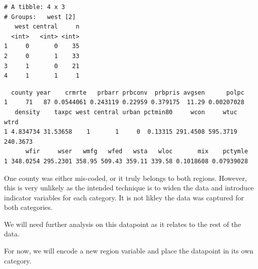 \documentclass[]{article}
\newenvironment{Shaded}{}{}
\newcommand{\DecValTok}[1]{#1}
\newcommand{\KeywordTok}[1]{\textcolor[rgb]{0.00,0.00,1.00}{#1}}
\newcommand{\NormalTok}[1]{#1}
\newcommand{\OperatorTok}[1]{#1}
\newcommand{\StringTok}[1]{\textcolor[rgb]{0.00,0.50,0.50}{#1}}
\begin{document}
\begin{verbatim}
# A tibble: 4 x 3
# Groups:   west [2]
   west central     n
  <int>   <int> <int>
1     0       0    35
2     0       1    33
3     1       0    21
4     1       1     1
\end{verbatim}

\begin{Shaded}
\end{Shaded}

\begin{verbatim}
  county year    crmrte   prbarr prbconv  prbpris avgsen      polpc
1     71   87 0.0544061 0.243119 0.22959 0.379175  11.29 0.00207028
   density    taxpc west central urban pctmin80     wcon     wtuc     wtrd
1 4.834734 31.53658    1       1     0  0.13315 291.4508 595.3719 240.3673
      wfir     wser   wmfg   wfed   wsta   wloc       mix    pctymle
1 348.0254 295.2301 358.95 509.43 359.11 339.58 0.1018608 0.07939028
\end{verbatim}

One county was either mis-coded, or it truly belongs to both regions.
However, this is very unlikely as the intended technique is to widen the
data and introduce indicator variables for each category. It is not
likley the data was captured for both categories.

We will need further analysis on this datapoint as it relates to the
rest of the data.

For now, we will encode a new region variable and place the datapoint in
its own category.
\end{document}
